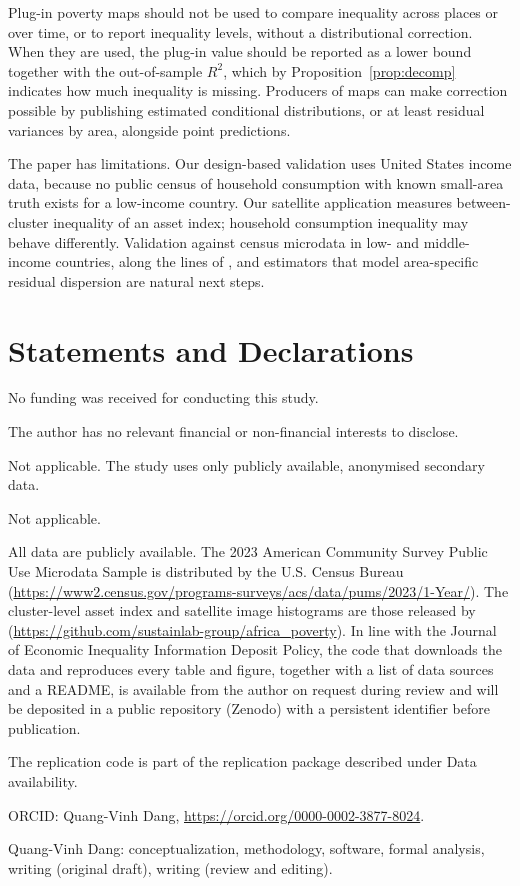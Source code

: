 \documentclass[pdflatex,sn-mathphys-ay]{sn-jnl}
\theoremstyle{thmstyleone}%
\theoremstyle{thmstyletwo}%
\theoremstyle{thmstylethree}%
\begin{document}
Plug-in poverty maps should not be used to compare inequality across places or over time, or to report inequality levels, without a distributional correction. When they are used, the plug-in value should be reported as a lower bound together with the out-of-sample $R^2$, which by Proposition~\ref{prop:decomp} indicates how much inequality is missing. Producers of maps can make correction possible by publishing estimated conditional distributions, or at least residual variances by area, alongside point predictions.

The paper has limitations. Our design-based validation uses United States income data, because no public census of household consumption with known small-area truth exists for a low-income country. Our satellite application measures between-cluster inequality of an asset index; household consumption inequality may behave differently. Validation against census microdata in low- and middle-income countries, along the lines of \citet{corral2025}, and estimators that model area-specific residual dispersion are natural next steps.

\backmatter

\section*{Statements and Declarations}

No funding was received for conducting this study.

The author has no relevant financial or non-financial interests to disclose.

Not applicable. The study uses only publicly available, anonymised secondary data.

Not applicable.

All data are publicly available. The 2023 American Community Survey Public Use Microdata Sample is distributed by the U.S. Census Bureau (\url{https://www2.census.gov/programs-surveys/acs/data/pums/2023/1-Year/}). The cluster-level asset index and satellite image histograms are those released by \citet{yeh2020} (\url{https://github.com/sustainlab-group/africa_poverty}). In line with the Journal of Economic Inequality Information Deposit Policy, the code that downloads the data and reproduces every table and figure, together with a list of data sources and a README, is available from the author on request during review and will be deposited in a public repository (Zenodo) with a persistent identifier before publication.

The replication code is part of the replication package described under Data availability.

ORCID: Quang-Vinh Dang, \url{https://orcid.org/0000-0002-3877-8024}.

Quang-Vinh Dang: conceptualization, methodology, software, formal analysis, writing (original draft), writing (review and editing).


\end{document}
